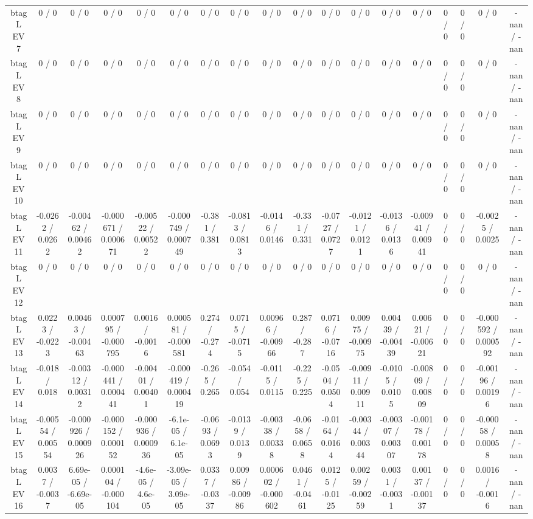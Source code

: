 \documentclass[10pt]{article}
\begin{document}
\begin{table}[htbp]
\begin{center}
\begin{tabular}{|c|c|c|c|c|c|c|c|c|c|c|c|c|c|c|c|c|c|}
  btag L EV 7 & 0 / 0 & 0 / 0 & 0 / 0 & 0 / 0 & 0 / 0 & 0 / 0 & 0 / 0 & 0 / 0 & 0 / 0 & 0 / 0 & 0 / 0 & 0 / 0 & 0 / 0 & 0 / 0 & 0 / 0 & 0 / 0 & -nan / -nan \\ 
  btag L EV 8 & 0 / 0 & 0 / 0 & 0 / 0 & 0 / 0 & 0 / 0 & 0 / 0 & 0 / 0 & 0 / 0 & 0 / 0 & 0 / 0 & 0 / 0 & 0 / 0 & 0 / 0 & 0 / 0 & 0 / 0 & 0 / 0 & -nan / -nan \\ 
  btag L EV 9 & 0 / 0 & 0 / 0 & 0 / 0 & 0 / 0 & 0 / 0 & 0 / 0 & 0 / 0 & 0 / 0 & 0 / 0 & 0 / 0 & 0 / 0 & 0 / 0 & 0 / 0 & 0 / 0 & 0 / 0 & 0 / 0 & -nan / -nan \\ 
  btag L EV 10 & 0 / 0 & 0 / 0 & 0 / 0 & 0 / 0 & 0 / 0 & 0 / 0 & 0 / 0 & 0 / 0 & 0 / 0 & 0 / 0 & 0 / 0 & 0 / 0 & 0 / 0 & 0 / 0 & 0 / 0 & 0 / 0 & -nan / -nan \\ 
  btag L EV 11 & -0.0262 / 0.0262 & -0.00462 / 0.00462 & -0.000671 / 0.000671 & -0.00522 / 0.00522 & -0.000749 / 0.000749 & -0.381 / 0.381 & -0.0813 / 0.0813 & -0.0146 / 0.0146 & -0.331 / 0.331 & -0.0727 / 0.0727 & -0.0121 / 0.0121 & -0.0136 / 0.0136 & -0.00941 / 0.00941 & 0 / 0 & 0 / 0 & -0.0025 / 0.0025 & -nan / -nan \\ 
  btag L EV 12 & 0 / 0 & 0 / 0 & 0 / 0 & 0 / 0 & 0 / 0 & 0 / 0 & 0 / 0 & 0 / 0 & 0 / 0 & 0 / 0 & 0 / 0 & 0 / 0 & 0 / 0 & 0 / 0 & 0 / 0 & 0 / 0 & -nan / -nan \\ 
  btag L EV 13 & 0.0223 / -0.0223 & 0.00463 / -0.00463 & 0.000795 / -0.000795 & 0.0016 / -0.0016 & 0.000581 / -0.000581 & 0.274 / -0.274 & 0.0715 / -0.0715 & 0.00966 / -0.00966 & 0.287 / -0.287 & 0.0716 / -0.0716 & 0.00975 / -0.00975 & 0.00439 / -0.00439 & 0.00621 / -0.00621 & 0 / 0 & 0 / 0 & -0.000592 / 0.000592 & -nan / -nan \\ 
  btag L EV 14 & -0.018 / 0.018 & -0.00312 / 0.00312 & -0.000441 / 0.000441 & -0.00401 / 0.00401 & -0.000419 / 0.000419 & -0.265 / 0.265 & -0.054 / 0.054 & -0.0115 / 0.0115 & -0.225 / 0.225 & -0.0504 / 0.0504 & -0.00911 / 0.00911 & -0.0105 / 0.0105 & -0.00809 / 0.00809 & 0 / 0 & 0 / 0 & -0.00196 / 0.00196 & -nan / -nan \\ 
  btag L EV 15 & -0.00554 / 0.00554 & -0.000926 / 0.000926 & -0.000152 / 0.000152 & -0.000936 / 0.000936 & -6.1e-05 / 6.1e-05 & -0.0693 / 0.0693 & -0.0139 / 0.0139 & -0.00338 / 0.00338 & -0.0658 / 0.0658 & -0.0164 / 0.0164 & -0.00344 / 0.00344 & -0.00307 / 0.00307 & -0.00178 / 0.00178 & 0 / 0 & 0 / 0 & -0.00058 / 0.00058 & -nan / -nan \\ 
  btag L EV 16 & 0.0037 / -0.0037 & 6.69e-05 / -6.69e-05 & 0.000104 / -0.000104 & -4.6e-05 / 4.6e-05 & -3.09e-05 / 3.09e-05 & 0.0337 / -0.0337 & 0.00986 / -0.00986 & 0.000602 / -0.000602 & 0.0461 / -0.0461 & 0.0125 / -0.0125 & 0.00259 / -0.00259 & 0.0031 / -0.0031 & 0.00137 / -0.00137 & 0 / 0 & 0 / 0 & 0.0016 / -0.0016 & -nan / -nan \\ 

\end{tabular}
\end{center}
\end{table}
\end{document}
